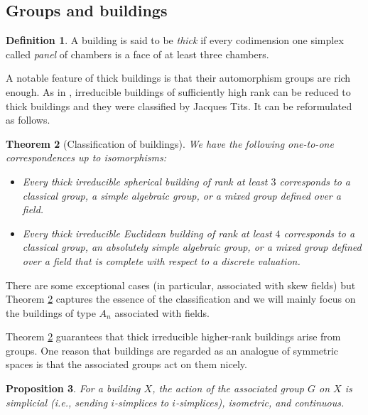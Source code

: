 \documentclass[letterpaper, reqno, 11pt]{amsart}
\newtheorem{theorem}{Theorem}[section]
\newtheorem{proposition}[theorem]{Proposition}
\theoremstyle{definition}
\newtheorem{definition}[theorem]{Definition}
\theoremstyle{definition}
\theoremstyle{remark}
\begin{document}
\subsection{Groups and buildings}

\begin{definition}
    A building is said to be \textit{thick} if every codimension one simplex called \textit{panel} of chambers is a face of at least three chambers.
\end{definition}
A notable feature of thick buildings is that their automorphism groups are rich enough. As in \cite [Section 3.7, Section 4.9]{kleiner1997rigidity}, irreducible buildings of sufficiently high rank can be reduced to thick buildings and they were classified by Jacques Tits. It can be reformulated as follows.
\begin{theorem} [Classification of buildings] \label{classify} 
We have the following one-to-one correspondences up to isomorphisms:
\begin{itemize}
    \item Every thick irreducible spherical building of rank at least $3$ corresponds to a classical group, a simple algebraic group, or a mixed group defined over a field.
    
    \item Every thick irreducible Euclidean building of rank at least $4$ %
    corresponds to a classical group, an absolutely simple algebraic group, or a mixed group defined over a field that is complete with respect to a discrete valuation.

\end{itemize}
\end{theorem}


There are some exceptional cases (in particular, associated with skew fields) but Theorem \ref{classify} captures the essence of the classification and we will mainly focus on the buildings of type $A_n$ associated with fields. 

Theorem \ref{classify} guarantees that thick irreducible higher-rank buildings arise from groups. One reason that buildings are regarded as an analogue of symmetric spaces is that the associated groups act on them nicely.

\begin{proposition}
    For a building $X$, the action of the associated group $G$ on $X$ is simplicial (i.e., sending $i$-simplices to $i$-simplices), isometric, and continuous. 
\end{proposition}
\end{document}
